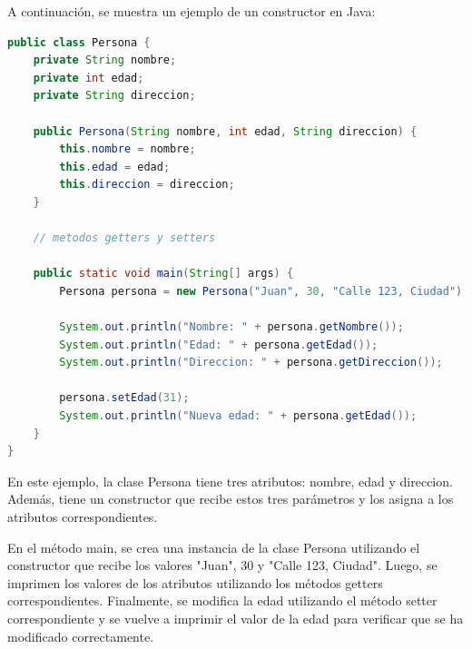\documentclass[executivepaper]{article}
\begin{document}
A continuación, se muestra un ejemplo de un constructor en Java:

\begin{lstlisting}[language=Java]
public class Persona {
    private String nombre;
    private int edad;
    private String direccion;
    
    public Persona(String nombre, int edad, String direccion) {
        this.nombre = nombre;
        this.edad = edad;
        this.direccion = direccion;
    }
    
    // metodos getters y setters
    
    public static void main(String[] args) {
        Persona persona = new Persona("Juan", 30, "Calle 123, Ciudad");
        
        System.out.println("Nombre: " + persona.getNombre());
        System.out.println("Edad: " + persona.getEdad());
        System.out.println("Direccion: " + persona.getDireccion());
        
        persona.setEdad(31);
        System.out.println("Nueva edad: " + persona.getEdad());
    }
}
\end{lstlisting}
En este ejemplo, la clase Persona tiene tres atributos: nombre, edad y direccion. Además, tiene un constructor que recibe estos tres parámetros y los asigna a los atributos correspondientes.

En el método main, se crea una instancia de la clase Persona utilizando el constructor que recibe los valores "Juan", 30 y "Calle 123, Ciudad". Luego, se imprimen los valores de los atributos utilizando los métodos getters correspondientes. Finalmente, se modifica la edad utilizando el método setter correspondiente y se vuelve a imprimir el valor de la edad para verificar que se ha modificado correctamente.
\end{document}
